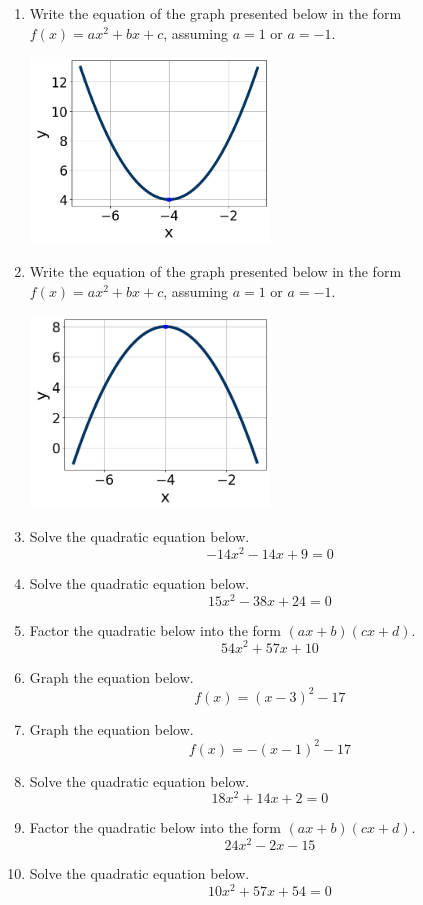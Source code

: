 \documentclass[14pt]{extbook}
\begin{document}
\begin{enumerate}
\item{
Write the equation of the graph presented below in the form $f(x)=ax^2+bx+c$, assuming  $a=1$ or $a=-1$.
\begin{center}
    \includegraphics[width=0.5\textwidth]{../Figures/quadraticGraphToEquationCopyC.png}
\end{center}
} \newpage
\item{
Write the equation of the graph presented below in the form $f(x)=ax^2+bx+c$, assuming  $a=1$ or $a=-1$.
\begin{center}
    \includegraphics[width=0.5\textwidth]{../Figures/quadraticGraphToEquationC.png}
\end{center}
} \newpage
\item{
Solve the quadratic equation below.\[ -14x^{2} -14 x + 9 = 0 \]} \newpage
\item{
Solve the quadratic equation below.\[ 15x^{2} -38 x + 24 = 0 \]} \newpage
\item{
Factor the quadratic below into the form $(ax+b)(cx+d)$.\[ 54x^{2} +57 x + 10 \]} \newpage
\item{
Graph the equation below.\[ f(x) = (x-3)^2 - 17 \]} \newpage
\item{
Graph the equation below.\[ f(x) = -(x-1)^2 - 17 \]} \newpage
\item{
Solve the quadratic equation below.\[ 18x^{2} +14 x + 2 = 0 \]} \newpage
\item{
Factor the quadratic below into the form $(ax+b)(cx+d)$.\[ 24x^{2} -2 x -15 \]} \newpage
\item{
Solve the quadratic equation below.\[ 10x^{2} +57 x + 54 = 0 \]} \newpage
\end{enumerate}
\end{document}
